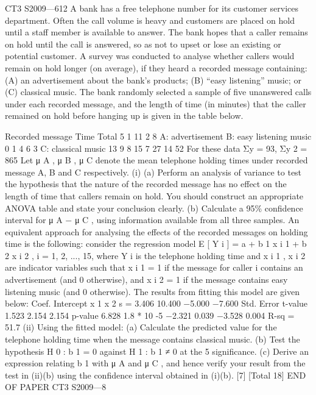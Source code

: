 \documentclass[a4paper,12pt]{article}
\begin{document}
\begin{enumerate}

CT3 S2009—612
A bank has a free telephone number for its customer services department. Often the call volume is heavy and customers are placed on hold until a staff member is available to answer. The bank hopes that a caller remains on hold until the call is
answered, so as not to upset or lose an existing or potential customer.
A survey was conducted to analyse whether callers would remain on hold longer (on average), if they heard a recorded message containing: (A) an advertisement about the bank’s products; (B) “easy listening” music; or (C) classical music. The bank
randomly selected a sample of five unanswered calls under each recorded message, and the length of time (in minutes) that the caller remained on hold before hanging up is given in the table below.

Recorded message
Time
Total
5 1 11 2 8
A: advertisement
B: easy listening music 0 1 4 6 3
C: classical music
13 9 8 15 7
27
14
52
For these data Σy = 93, Σy 2 = 865
Let μ A , μ B , μ C denote the mean telephone holding times under recorded message A, B and C respectively.
(i)
(a) Perform an analysis of variance to test the hypothesis that the nature of the recorded message has no effect on the length of time that callers remain on hold. You should construct an appropriate ANOVA table and state your conclusion clearly.
(b) Calculate a 95\% confidence interval for μ A − μ C , using information available from all three samples.
An equivalent approach for analysing the effects of the recorded messages on holding
time is the following:
consider the regression model E [ Y i ] = a + b 1 x i 1 + b 2 x i 2 , i = 1, 2, ..., 15, where
Y i is the telephone holding time and x i 1 , x i 2 are indicator variables such that x i 1 = 1 if the message for caller i contains an advertisement (and 0 otherwise), and x i 2 = 1 if the message contains easy listening music (and 0 otherwise).
The results from fitting this model are given below:
Coef.
Intercept
x 1
x 2
s = 3.406
10.400
−5.000
−7.600
Std. Error t-value
1.523
2.154
2.154
p-value
6.828 1.8 * 10 -5
−2.321
0.039
−3.528
0.004
R-sq = 51.7%
(ii)
Using the fitted model:
(a) Calculate the predicted value for the telephone holding time when the
message contains classical music.
(b) Test the hypothesis H 0 : b 1 = 0 against H 1 : b 1 ≠ 0 at the 5%
significance.
(c) Derive an expression relating b 1 with μ A and μ C , and hence verify
your result from the test in (ii)(b) using the confidence interval
obtained in (i)(b).
[7]
[Total 18]
END OF PAPER
CT3 S2009—8


\end{enumerate}
\end{document}
